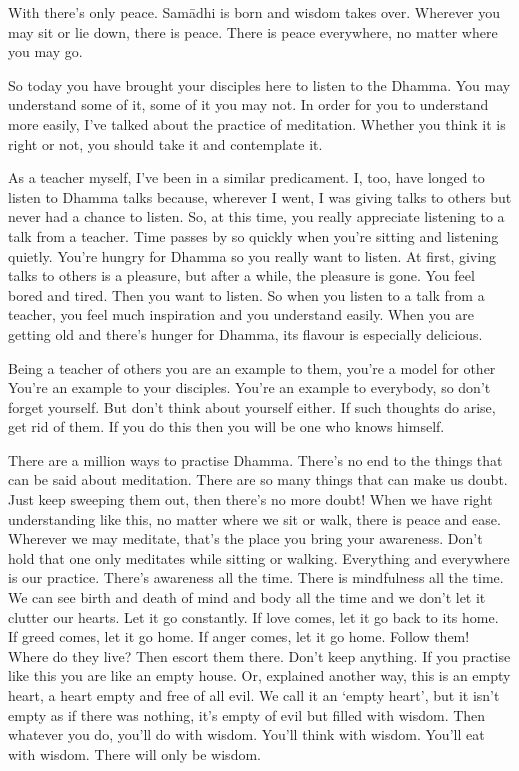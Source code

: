 With  there's only peace. Sam\=adhi is born and wisdom takes over. Wherever you may sit or lie down, there is peace. There is peace everywhere, no matter where you may go. 

So today you have brought your disciples here to listen to the Dhamma. You may understand some of it, some of it you may not. In order for you to understand more easily, I've talked about the practice of meditation. Whether you think it is right or not, you should take it and contemplate it. 

As a teacher myself, I've been in a similar predicament. I, too, have longed to listen to Dhamma talks because, wherever I went, I was giving talks to others but never had a chance to listen. So, at this time, you really appreciate listening to a talk from a teacher. Time passes by so quickly when you're sitting and listening quietly. You're hungry for Dhamma so you really want to listen. At first, giving talks to others is a pleasure, but after a while, the pleasure is gone. You feel bored and tired. Then you want to listen. So when you listen to a talk from a teacher, you feel much inspiration and you understand easily. When you are getting old and there's hunger for Dhamma, its flavour is especially delicious. 

Being a teacher of others you are an example to them, you're a model for other  You're an example to your disciples. You're an example to everybody, so don't forget yourself. But don't think about yourself either. If such thoughts do arise, get rid of them. If you do this then you will be one who knows himself. 

There are a million ways to practise Dhamma. There's no end to the things that can be said about meditation. There are so many things that can make us doubt. Just keep sweeping them out, then there's no more doubt! When we have right understanding like this, no matter where we sit or walk, there is peace and ease. Wherever we may meditate, that's the place you bring your awareness. Don't hold that one only meditates while sitting or walking. Everything and everywhere is our practice. There's awareness all the time. There is mindfulness all the time. We can see birth and death of mind and body all the time and we don't let it clutter our hearts. Let it go constantly. If love comes, let it go back to its home. If greed comes, let it go home. If anger comes, let it go home. Follow them! Where do they live? Then escort them there. Don't keep anything. If you practise like this you are like an empty house. Or, explained another way, this is an empty heart, a heart empty and free of all evil. We call it an `empty heart', but it isn't empty as if there was nothing, it's empty of evil but filled with wisdom. Then whatever you do, you'll do with wisdom. You'll think with wisdom. You'll eat with wisdom. There will only be wisdom. 

